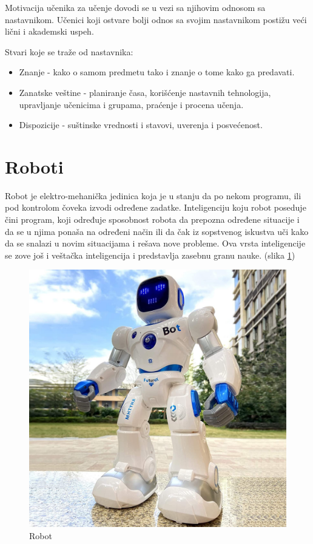 \documentclass[a4paper]{article}
\begin{document}
Motivacija učenika za učenje dovodi se u vezi sa njihovim odnosom sa nastavnikom. Učenici koji ostvare bolji odnos sa svojim nastavnikom postižu veći lični i akademski uspeh.

Stvari koje se traže od nastavnika:
\begin{itemize}
\item{} Znanje - kako o samom predmetu tako i znanje o tome kako ga predavati.
\item{} Zanatske veštine - planiranje časa, korišćenje nastavnih tehnologija, upravljanje učenicima i grupama, praćenje i procena učenja.
\item{} Dispozicije - suštinske vrednosti i stavovi, uverenja i posvećenost.
\end{itemize}


\newpage
\section{Roboti}
\label{sec:naslov3}

Robot je elektro-mehanička jedinica koja je u stanju da po nekom programu, ili pod kontrolom čoveka izvodi određene zadatke. Inteligenciju koju robot poseduje čini program, koji određuje sposobnost robota da prepozna određene situacije i da se u njima ponaša na određeni način ili da čak iz sopstvenog iskustva uči kako da se snalazi u novim situacijama i rešava nove probleme. Ova vrsta inteligencije se zove još i veštačka inteligencija i predstavlja zasebnu granu nauke. (slika \ref{fig:robot})

\begin{figure}[ht!]
\begin{center}
\includegraphics[scale=0.15]{robot1.jpg}
\end{center}
\caption{Robot}
\label{fig:robot}
\end{figure}
\end{document}
